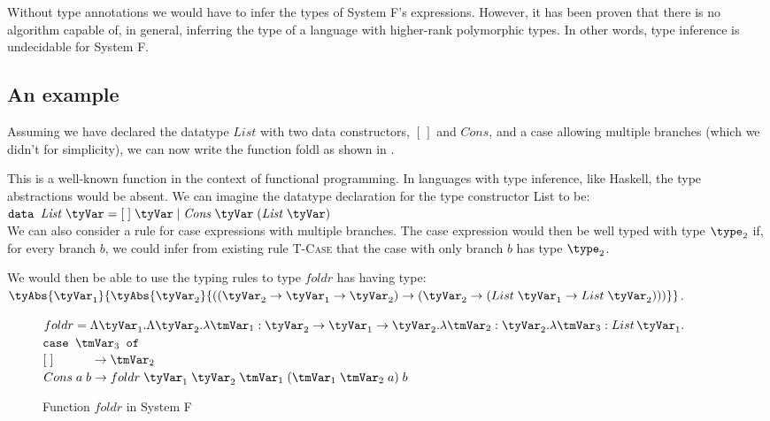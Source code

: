 Without type annotations we would have to infer the types of System F's expressions. However, it has been proven that there is no algorithm capable of, in general, inferring the type of a language with higher-rank polymorphic types. In other words, type inference is undecidable for System F.

\subsection{An example}
Assuming we have declared the datatype $List$ with two data constructors, $[\,]$ and $Cons$, and a case allowing multiple branches (which we didn't for simplicity), we can now write the function foldl as shown in .

This is a well-known function in the context of functional programming. In languages with type inference, like Haskell, the type abstractions would be absent.
We can imagine the datatype declaration for the type constructor List to be:\\
$\mathit{\texttt{data } List\; \tyVar = [\;]\;\tyVar\;|\;Cons \;\tyVar\;(\mathit{List}\;\tyVar)}$\\

We can also consider a rule for case expressions with multiple branches. The case expression would then be well typed with type $\type_2$ if, for every branch $b$, we could infer from existing rule \textsc{T-Case} that the case with only branch $b$ has type $\type_2$.

We would then be able to use the typing rules to type $foldr$ has having type:\\
$\tyAbs{\tyVar_1}{\tyAbs{\tyVar_2}{((\tyVar_2 \rightarrow \tyVar_1 \rightarrow \tyVar_2)\rightarrow (\tyVar_2 \rightarrow (List\;\tyVar_1\rightarrow List\;\tyVar_2)))}}$.

\begin{figure}
  
  $foldr = \Lambda \tyVar_1 . \Lambda \tyVar_2 . \lambda \tmVar_1:\tyVar_2 \rightarrow \tyVar_1 \rightarrow \tyVar_2 . \lambda \tmVar_2 : \tyVar_2 . \lambda \tmVar_3 : List \, \tyVar_1 .$\\
  \phantom{foldl aaa}$\mathit{\texttt{case }} \tmVar_3 \mathit{\texttt{ of }}$\\
  \phantom{foldl aaaaa}$[\;] \phantom{ns a b iii}\rightarrow \tmVar_2$\\
  \phantom{foldl aaaaa}$Cons \; a \; b \rightarrow foldr \; \tyVar_1 \;\tyVar_2 \; \tmVar_1 \; (\tmVar_1 \; \tmVar_2 \; a)  \; b$
  
  
  \caption{Function $foldr$ in System F}
  \label{foldr}
\end{figure}


